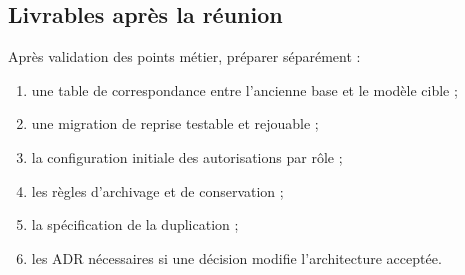 \subsection{Livrables après la réunion}

Après validation des points métier, préparer séparément :

\begin{enumerate}
  \item une table de correspondance entre l'ancienne base et le modèle cible ;
  \item une migration de reprise testable et rejouable ;
  \item la configuration initiale des autorisations par rôle ;
  \item les règles d'archivage et de conservation ;
  \item la spécification de la duplication ;
  \item les ADR nécessaires si une décision modifie l'architecture acceptée.
\end{enumerate}
